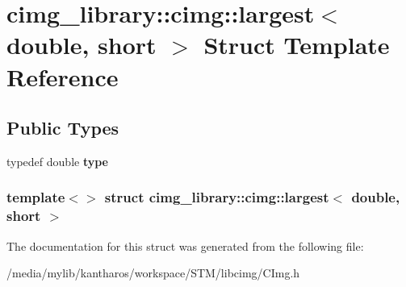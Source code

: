 \hypertarget{structcimg__library_1_1cimg_1_1largest_3_01double_00_01short_01_4}{
\section{cimg\_\-library::cimg::largest$<$ double, short $>$ Struct Template Reference}
\label{structcimg__library_1_1cimg_1_1largest_3_01double_00_01short_01_4}
}
\subsection*{Public Types}
\begin{DoxyCompactItemize}
\item 
\hypertarget{structcimg__library_1_1cimg_1_1largest_3_01double_00_01short_01_4_a55f0223098e4f18bf7efd3159bc3018e}{
typedef double {\bfseries type}}
\label{structcimg__library_1_1cimg_1_1largest_3_01double_00_01short_01_4_a55f0223098e4f18bf7efd3159bc3018e}

\end{DoxyCompactItemize}
\subsubsection*{template$<$$>$ struct cimg\_\-library::cimg::largest$<$ double, short $>$}



The documentation for this struct was generated from the following file:\begin{DoxyCompactItemize}
\item 
/media/mylib/kantharos/workspace/STM/libcimg/CImg.h\end{DoxyCompactItemize}
